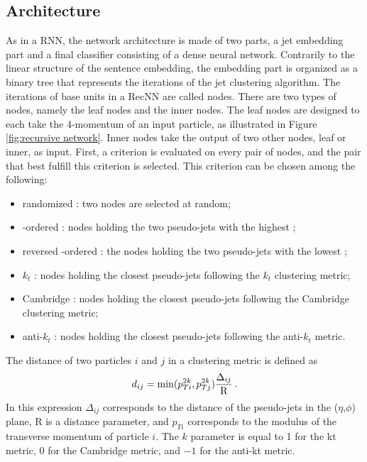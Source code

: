 \subsection{Architecture}

As in a RNN, the network architecture is made of two parts, a jet embedding part and a final classifier consisting of a dense neural network. Contrarily to the linear structure of the sentence embedding, the embedding part is organized as a binary tree that represents the iterations of the jet clustering algorithm. The iterations of base units in a RecNN are called nodes. There are two types of nodes, namely the leaf nodes and the inner nodes. The leaf nodes are designed to each take the 4-momentum of an input particle, as illustrated in Figure \ref{fig:recursive network}. Inner nodes take the output of two other nodes, leaf or inner, as input. First, a criterion is evaluated on every pair of nodes, and the pair that best fulfill this criterion is selected. This criterion can be chosen among the following:
    
\begin{itemize}
    \item randomized : two nodes are selected at random;
    \item \pt-ordered : nodes holding the two pseudo-jets with the highest \pt;
    \item reversed \pt-ordered : the nodes holding the two pseudo-jets with the lowest \pt;
    \item $k_t$ : nodes holding the closest pseudo-jets following the $k_t$ clustering metric;
    \item Cambridge : nodes holding the closest pseudo-jets following the Cambridge clustering metric;
    \item anti-$k_t$ : nodes holding the closest pseudo-jets following the anti-$k_t$ metric.
\end{itemize}
The distance of two particles $i$ and $j$ in a clustering metric is defined as
\begin{equation}
    d_{ij} = \mathrm{min}(p_{Ti}^{2k},p_{Tj}^{2k}) \frac{\Delta_{ij}}{\mathrm{R}} \mend
\end{equation}
In this expression $\Delta_{ij}$ corresponds to the distance of the pseudo-jets in the ($\eta$,$\phi$) plane, R is a distance parameter, and $p_{Ti}$ corresponds to the modulus of the transverse momentum of particle $i$. The $k$ parameter is equal to 1 for the kt metric, 0 for the Cambridge metric, and $-1$ for the anti-kt metric.


